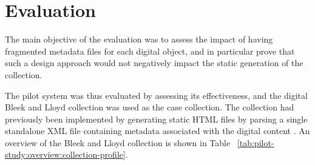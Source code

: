 \section{Evaluation}
\label{sec:pilot-study:evaluation}

The main objective of the evaluation was to assess the impact of having
fragmented metadata files for each digital object, and in particular prove that
such a design approach would not negatively impact the static generation of the
collection.

The pilot system was thus evaluated by assessing its effectiveness, and the
digital Bleek and Lloyd collection \citep{Suleman2007} was used as
the case collection. The collection had previously been implemented by
generating static HTML files by parsing a single standalone XML file
containing metadata associated with the digital content \citep{Suleman2007}. An
overview of the Bleek and Lloyd collection is shown in Table
~\ref{tab:pilot-study:overview:collection-profile}.

\tablespacing

\bodyspacing

